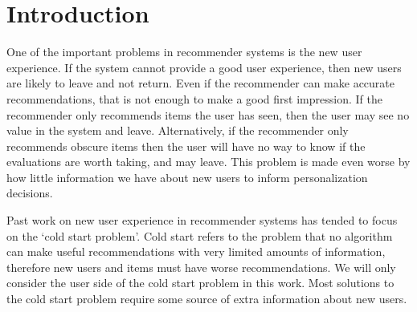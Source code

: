 \documentclass[letterpaper]{sig-alternate}
\begin{document}



\section{Introduction}

  One of the important problems in recommender systems is the new user experience.
  If the system cannot provide a good user experience, then new users are likely to leave and not return.
  Even if the recommender can make accurate recommendations, that is not enough to make a good first impression.
  If the recommender only recommends items the user has seen, then the user may see no value in the system and leave.
  Alternatively, if the recommender only recommends obscure items then the user will have no way to know if the evaluations are worth taking, and may leave.
  This problem is made even worse by how little information we have about new users to inform personalization decisions.
  

  Past work on new user experience in recommender systems has tended to focus on the `cold start problem'.
  Cold start refers to the problem that no algorithm can make useful recommendations with very limited amounts of information, therefore new users and items must have worse recommendations.
  We will only consider the user side of the cold start problem in this work.
  Most solutions to the cold start problem require some source of extra information about new users.
  
\end{document}
